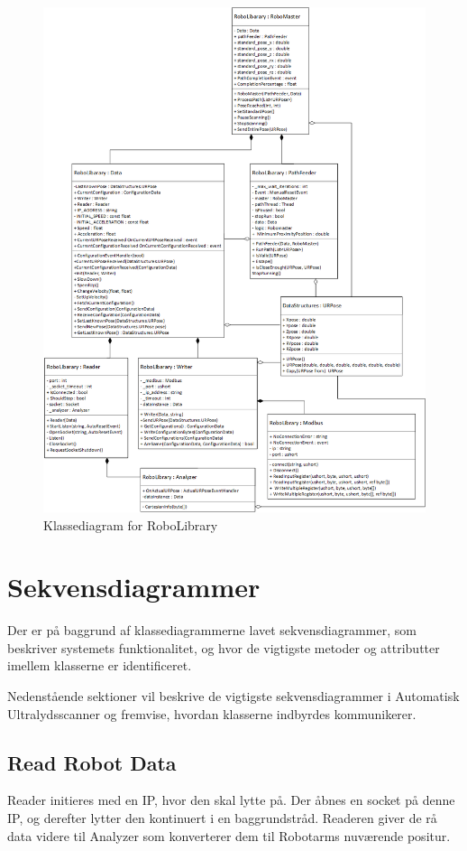 \begin{figure}[H]
    \centering
    \includegraphics[width=1\textwidth]{figurer/d/Design/Class/uml_class_robolibrary}
    \caption{Klassediagram for RoboLibrary}
    \label{class_RoboLib}
\end{figure}
\newpage

\section{Sekvensdiagrammer}
Der er på baggrund af klassediagrammerne lavet sekvensdiagrammer, som beskriver systemets funktionalitet, og hvor de vigtigste metoder og attributter imellem klasserne er identificeret.

Nedenstående sektioner vil beskrive de vigtigste sekvensdiagrammer i Automatisk Ultralydsscanner og fremvise, hvordan klasserne indbyrdes kommunikerer. 

\subsection{Read Robot Data} 
Reader initieres med en IP, hvor den skal lytte på. 
Der åbnes en socket på denne IP, og derefter lytter den kontinuert i en baggrundstråd. 
Readeren giver de rå data videre til Analyzer som konverterer dem til Robotarms nuværende positur.

